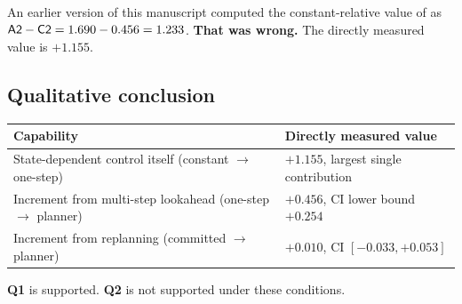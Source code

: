 An earlier version of this manuscript computed the constant-relative value of
 as $\textsf{A2} - \textsf{C2} = 1.690 - 0.456 = 1.233$. \textbf{That was
wrong.} The directly measured value is $+1.155$.

\subsection{Qualitative conclusion}

\begin{center}
\begin{tabularx}{\linewidth}{@{}Xl@{}}
\toprule
Capability & Directly measured value \\
\midrule
State-dependent control itself (constant $\rightarrow$ one-step)
  & $+1.155$, largest single contribution \\
Increment from multi-step lookahead (one-step $\rightarrow$ planner)
  & $+0.456$, CI lower bound $+0.254$ \\
Increment from replanning (committed $\rightarrow$ planner)
  & $+0.010$, CI $[-0.033, +0.053]$ \\
\bottomrule
\end{tabularx}
\end{center}

\textbf{Q1} is supported. \textbf{Q2} is not supported under these conditions.
